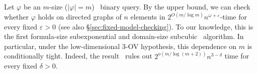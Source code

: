 Let $\varphi$ be an $m$-size ($|\varphi| = m$) \FOthree\ binary query.
By the upper bound,
we can check whether $\varphi$ holds on directed graphs of $n$ elements in
$2^{O(m/\log m)}n^{\omega+\varepsilon}$-time
for every fixed $\varepsilon>0$
(see also \S\ref{sec:fixed-model-checking}).
To our knowledge, this is the first formula-size subexponential and domain-size subcubic \FOthree\ algorithm.
In particular, under the low-dimensional 3-OV hypothesis, this dependence on $m$ is conditionally tight.
Indeed, the result~\citep[Theorem~72]{nakamura-uezato2027} rules out $2^{o(m/\log(m+2))}n^{3-\delta}$ time for every fixed
$\delta>0$.
\fi
